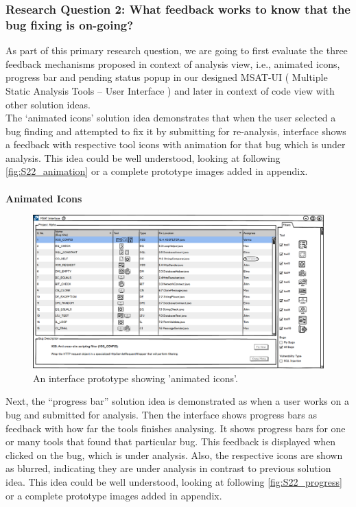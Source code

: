 \subsubsection{Research Question 2: What feedback works to know that the bug fixing is on-going?}

As part of this primary research question, we are going to first evaluate the three feedback mechanisms proposed in context of analysis view, i.e., animated icons, progress bar and pending status popup in our designed MSAT-UI ( Multiple Static Analysis Tools – User Interface ) and later in context of code view with other solution ideas. \\

The ‘animated icons’ solution idea demonstrates that when the user selected a bug finding and attempted to fix it by submitting for re-analysis, interface shows a feedback with respective tool icons with animation for that bug which is under analysis. This idea could be well understood, looking at following \autoref{fig:S22_animation} or a complete prototype images added in appendix.  \\ \\

\textbf{Animated Icons}
\begin{figure}[hbt!]
	\centering
	\includegraphics[width=\linewidth]{figures/solution_ideas_snaps/S22_animation}
	\caption{An interface prototype showing 'animated icons'.}
	\label{fig:S22_animation}
\end{figure}


Next, the “progress bar” solution idea is demonstrated as when a user works on a  bug and submitted for analysis.  Then the interface shows progress bars as feedback with how far the tools finishes analysing. It shows progress bars for one or many tools that found that particular bug. This feedback is displayed when clicked on the bug, which is under analysis. Also, the respective icons are shown as blurred, indicating they are under analysis in contrast to previous solution idea. This idea could be well understood, looking at following \autoref{fig:S22_progress} or a complete prototype images added in appendix.  \\ \\

